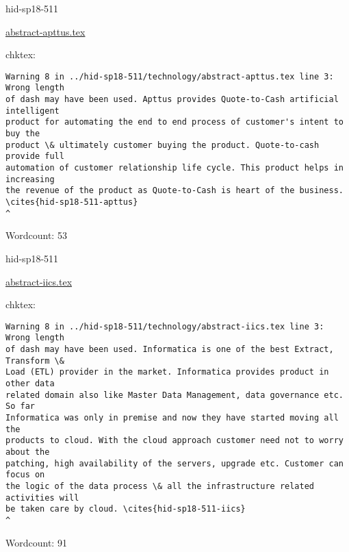 \begin{IU}

hid-sp18-511

\href{https://github.com/cloudmesh-community/hid-sp18-511/blob/master//technology/abstract-apttus.tex}{abstract-apttus.tex}

 
chktex:
\begin{tiny}
\begin{verbatim}
Warning 8 in ../hid-sp18-511/technology/abstract-apttus.tex line 3: Wrong length
of dash may have been used. Apttus provides Quote-to-Cash artificial intelligent
product for automating the end to end process of customer's intent to buy the
product \& ultimately customer buying the product. Quote-to-cash provide full
automation of customer relationship life cycle. This product helps in increasing
the revenue of the product as Quote-to-Cash is heart of the business.
\cites{hid-sp18-511-apttus}
^
\end{verbatim}
\end{tiny}

Wordcount: 53

\end{IU}



\begin{IU}

hid-sp18-511

\href{https://github.com/cloudmesh-community/hid-sp18-511/blob/master//technology/abstract-iics.tex}{abstract-iics.tex}

 
chktex:
\begin{tiny}
\begin{verbatim}
Warning 8 in ../hid-sp18-511/technology/abstract-iics.tex line 3: Wrong length
of dash may have been used. Informatica is one of the best Extract, Transform \&
Load (ETL) provider in the market. Informatica provides product in other data
related domain also like Master Data Management, data governance etc. So far
Informatica was only in premise and now they have started moving all the
products to cloud. With the cloud approach customer need not to worry about the
patching, high availability of the servers, upgrade etc. Customer can focus on
the logic of the data process \& all the infrastructure related activities will
be taken care by cloud. \cites{hid-sp18-511-iics}
^
\end{verbatim}
\end{tiny}

Wordcount: 91

\end{IU}

